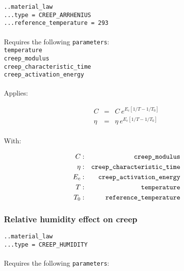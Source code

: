 \documentclass[10pt]{article}
\begin{document}
\noindent \verb+..material_law+\\
\verb+...type = CREEP_ARRHENIUS+\\
\verb+...reference_temperature = 293+

\paragraph{}Requires the following \verb+parameters+:\\

\noindent \verb+temperature+\\
\verb+creep_modulus+\\
\verb+creep_characteristic_time+\\
\verb+creep_activation_energy+

\paragraph{}Applies:

\begin{eqnarray}
	C & = & C\ e^{E_c \left[ 1/T - 1/T_0 \right]} \\
	\eta & = & \eta\ e^{E_c \left[ 1/T - 1/T_0 \right]} \\
\end{eqnarray}

With:

\begin{eqnarray}
	C & : & \verb+creep_modulus+ \notag \\
	\eta & : & \verb+creep_characteristic_time+ \notag \\
	E_c & : & \verb+creep_activation_energy+\notag  \\
	T & : & \verb+temperature+ \notag \\
	T_0 & : & \verb+reference_temperature+ \notag 
\end{eqnarray}

\subsubsection{Relative humidity effect on creep}

\noindent \verb+..material_law+\\
\verb+...type = CREEP_HUMIDITY+

\paragraph{}Requires the following \verb+parameters+:\\
\end{document}
